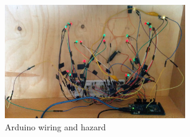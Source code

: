 \begin{figure}[H]\label{fig:ardhazard}
  \centering
    \includegraphics[width=0.7\textwidth]{../common/images/arduinowiring.jpg}
    \caption{Arduino wiring and hazard}
\end{figure}